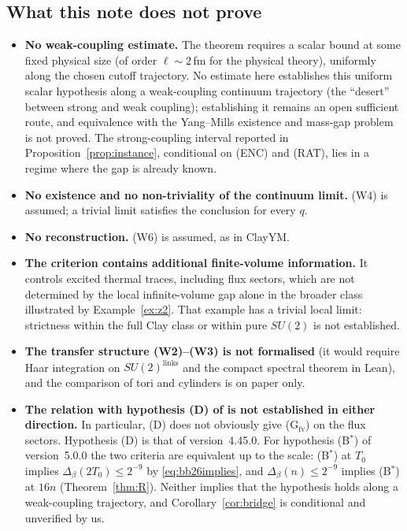 \documentclass[11pt,a4paper]{article}
\theoremstyle{plain}
\theoremstyle{definition}
\theoremstyle{remark}
\numberwithin{equation}{section}
\begin{document}
\subsection{What this note does not prove}\label{sec:notprove}
\begin{itemize}
\item \textbf{No weak-coupling estimate.} The theorem requires a scalar bound at some fixed physical size (of order $\ell\sim2$\,fm
for the physical theory), uniformly along the chosen cutoff trajectory. No estimate here establishes this uniform scalar hypothesis along a weak-coupling continuum trajectory (the ``desert'' between strong and weak coupling); establishing it remains an open sufficient route, and equivalence with the Yang--Mills existence and mass-gap problem is not proved. The strong-coupling interval reported in Proposition~\ref{prop:instance}, conditional on (ENC) and (RAT), lies in a regime where the gap is already known.
\item \textbf{No existence and no non-triviality of the continuum limit.} (W4) is assumed; a trivial limit satisfies the conclusion
for every $q$.
\item \textbf{No reconstruction.} (W6) is assumed, as in ClayYM.
\item \textbf{The criterion contains additional finite-volume information.} It controls excited thermal traces, including flux
sectors, which are not determined by the local infinite-volume gap alone in the broader class illustrated by Example~\ref{ex:z2}. That example
has a trivial local limit: strictness within the full Clay class or within pure $SU(2)$ is not established.
\item \textbf{The transfer structure (W2)--(W3) is not formalised} (it would require Haar integration on $SU(2)^{\text{links}}$ and the
compact spectral theorem in Lean), and the comparison of tori and cylinders is on paper only.
\item \textbf{The relation with hypothesis (D) of \cite{BB26} is not established in either direction.} In particular, (D) does not
obviously give (G$_{\mathrm{fv}}$) on the flux sectors. Hypothesis (D) is that of version~4.45.0. For hypothesis (B$^*$) of version~5.0.0
\cite{BB26v5} the two criteria are equivalent up to the scale: (B$^*$) at $T_0$ implies $\Delta_\beta(2T_0)\le2^{-9}$ by \eqref{eq:bb26implies}, and $\Delta_\beta(n)\le2^{-9}$ implies (B$^*$) at $16n$ (Theorem~\ref{thm:R}). Neither implies that the hypothesis holds along a weak-coupling trajectory, and Corollary~\ref{cor:bridge} is conditional and unverified by us.

\end{itemize}
\end{document}
